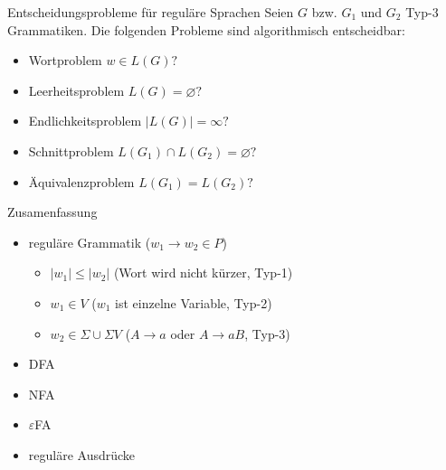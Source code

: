 \begin{frame}{Entscheidungsprobleme für reguläre Sprachen}
	Seien $G$ bzw. $G_1$ und $G_2$ Typ-3 Grammatiken. Die folgenden
	Probleme sind algorithmisch entscheidbar:
	\begin{itemize}
		\item Wortproblem $w \in L(G)?$
		\item Leerheitsproblem $L(G) = \varnothing?$
		\item Endlichkeitsproblem $|L(G)|=\infty ?$
		\item Schnittproblem $L(G_1) \cap L(G_2) = \varnothing ?$
		\item Äquivalenzproblem $L(G_1) = L(G_2)?$
	\end{itemize}
\end{frame}

\begin{frame}{Zusamenfassung}
	\begin{itemize}
		\item reguläre Grammatik ($w_1 \rightarrow w_2 \in P$)
		\begin{itemize}
			\item $|w_1|\leq|w_2|$ (Wort wird nicht kürzer, Typ-1)
			\item $w_1 \in V$ ($w_1$ ist einzelne Variable, Typ-2)
			\item $w_2 \in \Sigma \cup \Sigma V$ ($A \rightarrow a$ oder $A \rightarrow aB$, Typ-3)
		\end{itemize}
		\item DFA
		\item NFA
		\item $\varepsilon$FA
		\item reguläre Ausdrücke
	\end{itemize}
\end{frame}